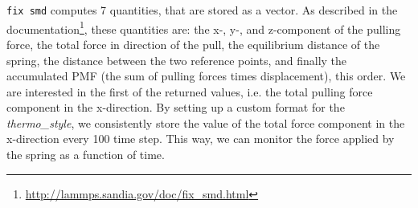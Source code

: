 \documentclass[twoside,english]{uiofysmaster}
\begin{document}
\texttt{fix smd} computes 7 quantities, that are stored as a vector. 
As described in the documentation\footnote{\href{http://lammps.sandia.gov/doc/fix_smd.html}{\url{http://lammps.sandia.gov/doc/fix_smd.html}}}, 
these quantities are:  the x-, y-, and z-component of the pulling force, the total force in direction of the pull, the equilibrium distance of the spring, the distance between the two reference points, and finally the accumulated PMF (the sum of pulling forces times displacement), this order.
We are interested in the first of the returned values, i.e. the total pulling force component in the x-direction.
By setting up a custom format for the \textit{thermo\_style}, we consistently store the value of the total force component in the x-direction every 100 time step. 
This way, we can monitor the force applied by the spring as a function of time.
\end{document}
